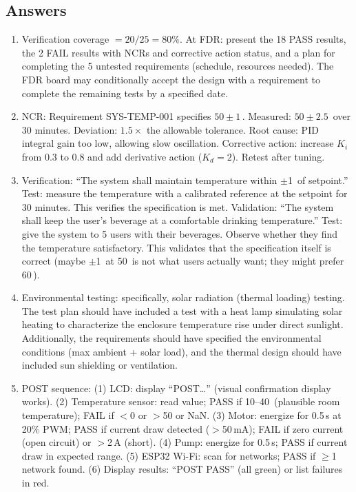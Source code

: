 \subsection{Answers}
\begin{enumerate}[leftmargin=1.5em]
\item Verification coverage $= 20/25 = 80\%$. At FDR: present the 18 PASS results, the 2 FAIL results with NCRs and corrective action status, and a plan for completing the 5 untested requirements (schedule, resources needed). The FDR board may conditionally accept the design with a requirement to complete the remaining tests by a specified date.
\item NCR: Requirement SYS-TEMP-001 specifies $50 \pm 1$\,\degC{}. Measured: $50 \pm 2.5$\,\degC{} over 30 minutes. Deviation: $1.5\times$ the allowable tolerance. Root cause: PID integral gain too low, allowing slow oscillation. Corrective action: increase $K_i$ from 0.3 to 0.8 and add derivative action ($K_d = 2$). Retest after tuning.
\item Verification: ``The system shall maintain temperature within $\pm$1\,\degC{} of setpoint.'' Test: measure the temperature with a calibrated reference at the setpoint for 30 minutes. This verifies the specification is met. Validation: ``The system shall keep the user's beverage at a comfortable drinking temperature.'' Test: give the system to 5 users with their beverages. Observe whether they find the temperature satisfactory. This validates that the specification itself is correct (maybe $\pm$1\,\degC{} at 50\,\degC{} is not what users actually want; they might prefer 60\,\degC{}).
\item Environmental testing: specifically, solar radiation (thermal loading) testing. The test plan should have included a test with a heat lamp simulating solar heating to characterize the enclosure temperature rise under direct sunlight. Additionally, the requirements should have specified the environmental conditions (max ambient + solar load), and the thermal design should have included sun shielding or ventilation.
\item POST sequence: (1) LCD: display ``POST\ldots'' (visual confirmation display works). (2) Temperature sensor: read value; PASS if 10--40\,\degC{} (plausible room temperature); FAIL if $<$0 or $>$50 or NaN. (3) Motor: energize for 0.5\,s at 20\% PWM; PASS if current draw detected ($>$50\,mA); FAIL if zero current (open circuit) or $>$2\,A (short). (4) Pump: energize for 0.5\,s; PASS if current draw in expected range. (5) ESP32 Wi-Fi: scan for networks; PASS if $\geq$1 network found. (6) Display results: ``POST PASS'' (all green) or list failures in red.
\end{enumerate}
